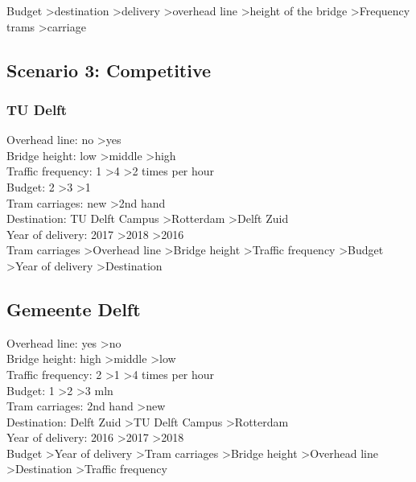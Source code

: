 \documentclass{article}
\begin{document}
Budget \textgreater destination \textgreater delivery \textgreater overhead line \textgreater height of the bridge \textgreater Frequency trams \textgreater carriage\\

\subsection{Scenario 3: Competitive}
\subsubsection{TU Delft}
Overhead line: no \textgreater yes \\
Bridge height: low \textgreater middle \textgreater high \\
Traffic frequency: 1 \textgreater 4 \textgreater 2 times per hour \\
Budget: 2 \textgreater 3 \textgreater 1 \\
Tram carriages: new \textgreater 2nd hand \\
Destination: TU Delft Campus \textgreater Rotterdam \textgreater Delft Zuid \\
Year of delivery: 2017 \textgreater 2018 \textgreater 2016 \\

Tram carriages \textgreater Overhead line \textgreater Bridge height \textgreater Traffic frequency \textgreater Budget \textgreater Year of delivery \textgreater Destination\\


\subsection{Gemeente Delft}
Overhead line: yes \textgreater no \\
Bridge height: high \textgreater middle \textgreater low \\
Traffic frequency: 2 \textgreater 1 \textgreater 4 times per hour \\
Budget: 1 \textgreater 2 \textgreater 3 mln \\
Tram carriages: 2nd hand \textgreater new \\
Destination: Delft Zuid \textgreater TU Delft Campus \textgreater Rotterdam \\
Year of delivery: 2016 \textgreater 2017 \textgreater 2018 \\

Budget \textgreater Year of delivery \textgreater Tram carriages \textgreater Bridge height \textgreater Overhead line \textgreater Destination \textgreater Traffic frequency\\
\end{document}
